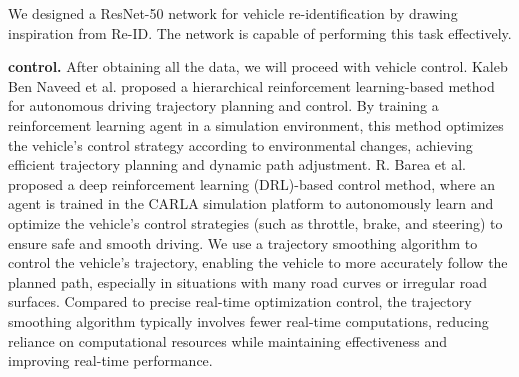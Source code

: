 We designed a ResNet-50 network for vehicle re-identification by drawing inspiration from Re-ID.
The network is capable of performing this task effectively.

\textbf{control.}
After obtaining all the data, we will proceed with vehicle control. 
Kaleb Ben Naveed et al. proposed a hierarchical reinforcement learning-based method for autonomous driving trajectory planning and control. 
By training a reinforcement learning agent in a simulation environment, this method optimizes the vehicle's control strategy according to environmental changes, achieving efficient trajectory planning and dynamic path adjustment.\cite{Alpher22}
R. Barea et al. proposed a deep reinforcement learning (DRL)-based control method, where an agent is trained in the CARLA simulation platform to autonomously learn and optimize the vehicle's control strategies (such as throttle, brake, and steering) to ensure safe and smooth driving.\cite{Alpher21}
We use a trajectory smoothing algorithm to control the vehicle's trajectory, enabling the vehicle to more accurately follow the planned path, especially in situations with many road curves or irregular road surfaces. 
Compared to precise real-time optimization control, the trajectory smoothing algorithm typically involves fewer real-time computations, reducing reliance on computational resources while maintaining effectiveness and improving real-time performance.
